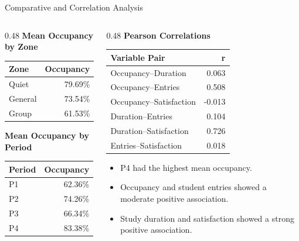 \documentclass[aspectratio=169,11pt]{beamer}
\begin{document}
\begin{frame}{Comparative and Correlation Analysis}
	\scriptsize
	
	\begin{columns}[T]
		
		\begin{column}{0.48\textwidth}
			\textbf{Mean Occupancy by Zone}
			
			\begin{tabular}{lr}
				\toprule
				\textbf{Zone} & \textbf{Occupancy} \\
				\midrule
				Quiet & 79.69\% \\
				General & 73.54\% \\
				Group & 61.53\% \\
				\bottomrule
			\end{tabular}
			
			\vspace{0.25cm}
			
			\textbf{Mean Occupancy by Period}
			
			\begin{tabular}{lr}
				\toprule
				\textbf{Period} & \textbf{Occupancy} \\
				\midrule
				P1 & 62.36\% \\
				P2 & 74.26\% \\
				P3 & 66.34\% \\
				P4 & 83.38\% \\
				\bottomrule
			\end{tabular}
		\end{column}
		
		\begin{column}{0.48\textwidth}
			\textbf{Pearson Correlations}
			
			\begin{tabular}{lr}
				\toprule
				\textbf{Variable Pair} & \textbf{r} \\
				\midrule
				Occupancy--Duration & 0.063 \\
				Occupancy--Entries & 0.508 \\
				Occupancy--Satisfaction & -0.013 \\
				Duration--Entries & 0.104 \\
				Duration--Satisfaction & 0.726 \\
				Entries--Satisfaction & 0.018 \\
				\bottomrule
			\end{tabular}
			
			\vspace{0.25cm}
			
			\begin{itemize}
				\item P4 had the highest mean occupancy.
				\item Occupancy and student entries showed a moderate positive association.
				\item Study duration and satisfaction showed a strong positive association.
			\end{itemize}
		\end{column}
		
	\end{columns}
\end{frame}
\end{document}
